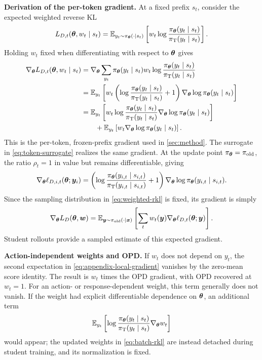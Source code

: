 \documentclass{article} %
\begin{document}
\noindent\textbf{Derivation of the per-token gradient.}\enspace
At a fixed prefix \(s_t\), consider the expected weighted reverse KL
\[
    L_{D,t}(\bm{\theta},w_t\mid s_t)
    =\mathbb E_{y_t\sim\pi_{\bm{\theta}}(\cdot\mid s_t)}
    \left[
        w_t\log\frac{\pi_{\bm{\theta}}(y_t\mid s_t)}
                      {\pi_{\mathrm T}(y_t\mid s_t)}
    \right].
\]
Holding \(w_t\) fixed when differentiating with respect to \(\bm{\theta}\) gives
\begin{align}
    \nabla_{\bm{\theta}}L_{D,t}(\bm{\theta},w_t\mid s_t)
    &=
    \nabla_{\bm{\theta}}
    \sum_{y_t}
        \pi_{\bm{\theta}}(y_t\mid s_t)w_t
        \log
        \frac{\pi_{\bm{\theta}}(y_t\mid s_t)}
             {\pi_{\mathrm{T}}(y_t\mid s_t)}
    \nonumber\\
    &=
    \mathbb E_{y_t}\left[
        w_t
        \left(
            \log
            \frac{\pi_{\bm{\theta}}(y_t\mid s_t)}
                 {\pi_{\mathrm{T}}(y_t\mid s_t)}
            +1
        \right)
        \nabla_{\bm{\theta}}\log\pi_{\bm{\theta}}(y_t\mid s_t)
    \right] \nonumber\\
    &=
    \mathbb E_{y_t}\left[
        w_t
        \log
        \frac{\pi_{\bm{\theta}}(y_t\mid s_t)}
             {\pi_{\mathrm{T}}(y_t\mid s_t)}
        \nabla_{\bm{\theta}}\log\pi_{\bm{\theta}}(y_t\mid s_t)
    \right]
    \nonumber\\
    &\qquad+
    \mathbb E_{y_t}\left[
        w_t
        \nabla_{\bm{\theta}}\log\pi_{\bm{\theta}}(y_t\mid s_t)
    \right].
    \label{eq:appendix-local-gradient}
\end{align}
This is the per-token, frozen-prefix gradient used in \cref{sec:method}.
The surrogate in \cref{eq:token-surrogate} realizes the same gradient.
At the update point \(\pi_{\bm{\theta}}=\pi_{\mathrm{old}}\), the ratio
\(\rho_t=1\) in value but remains differentiable, giving
\[
    \nabla_{\bm{\theta}}
    \ell_{D,i,t}(\bm{\theta};\bm{y}_i)
    =
    \left(
        \log
        \frac{\pi_{\bm{\theta}}(y_{i,t}\mid s_{i,t})}
             {\pi_{\mathrm{T}}(y_{i,t}\mid s_{i,t})}
        +1
    \right)
    \nabla_{\bm{\theta}}\log\pi_{\bm{\theta}}(y_{i,t}\mid s_{i,t}).
\]
Since the sampling distribution in \cref{eq:weighted-rkl} is fixed, its
gradient is simply
\[
    \nabla_{\bm{\theta}}L_D(\bm{\theta},\bm{w})
    =\mathbb E_{\bm{y}\sim\pi_{\mathrm{old}}(\cdot\mid\bm{x})}
    \left[
        \sum_t w_t(\bm{y})\nabla_{\bm{\theta}}\ell_{D,t}(\bm{\theta};\bm{y})
    \right].
\]
Student rollouts provide a sampled estimate of this expected gradient.

\noindent\textbf{Action-independent weights and OPD.}\enspace
If \(w_t\) does not depend on \(y_t\), the second expectation in
\cref{eq:appendix-local-gradient} vanishes by the zero-mean score identity.
The result is \(w_t\) times the OPD gradient, with OPD recovered at
\(w_t=1\). For an action- or response-dependent weight, this term
generally does not vanish. If the weight had explicit differentiable
dependence on \(\bm{\theta}\), an additional term
\[
    \mathbb E_{y_t}\left[
        \log
        \frac{\pi_{\bm{\theta}}(y_t\mid s_t)}
             {\pi_{\mathrm{T}}(y_t\mid s_t)}
        \nabla_{\bm{\theta}}w_t
    \right]
\]
would appear;
the updated weights in \cref{eq:batch-rkl} are instead detached during
student training, and its normalization is fixed.
\end{document}
